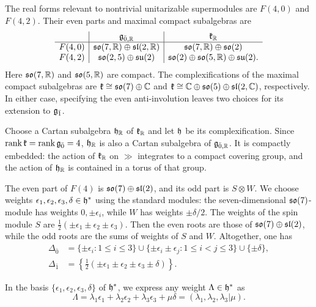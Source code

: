 The real forms relevant to nontrivial unitarizable supermodules
are $F(4,0)$ and $F(4,2)$. Their even parts and maximal compact
subalgebras are
\begin{equation}
\begin{array}{c|c|c}
&{\mathfrak{g}}_{\bar0,{\mathbb R}}&{\mathfrak k}_{{\mathbb R}}\\ \hline
F(4,0)
&{\mathfrak{so}}(7,{\mathbb R})\oplus{\mathfrak{sl}}(2,{\mathbb R})
&{\mathfrak{so}}(7,{\mathbb R})\oplus{\mathfrak{so}}(2)\\
F(4,2)
&{\mathfrak{so}}(2,5)\oplus{\mathfrak{su}}(2)
&{\mathfrak{so}}(2)\oplus{\mathfrak{so}}(5,{\mathbb R})\oplus{\mathfrak{su}}(2).
\end{array}
\end{equation}
Here ${\mathfrak{so}}(7,{\mathbb R})$ and ${\mathfrak{so}}(5,{\mathbb R})$ are compact. The
complexifications of the maximal compact subalgebras are
${\mathfrak k}\cong{\mathfrak{so}}(7)\oplus{\mathbb C}$ and
${\mathfrak k}\cong{\mathbb C}\oplus{\mathfrak{so}}(5)\oplus{\mathfrak{sl}}(2,{\mathbb C})$, respectively.
In either case, specifying the even anti-involution leaves
two choices for its extension to ${\mathfrak{g}_{\bar{1}}}$.

Choose a Cartan subalgebra ${\mathfrak h}_{{\mathbb R}}$ of ${\mathfrak k}_{{\mathbb R}}$ and
let ${\mathfrak h}$ be its complexification. Since
$\operatorname{rank}{\mathfrak k}=\operatorname{rank}{\mathfrak{g}_{\bar{0}}}=4$,
${\mathfrak h}_{{\mathbb R}}$ is also a Cartan subalgebra of ${\mathfrak{g}}_{\bar0,{\mathbb R}}$.
It is compactly embedded: the action of ${\mathfrak k}_{{\mathbb R}}$ on $\gg$
integrates to a compact covering group, and the action of
${\mathfrak h}_{{\mathbb R}}$ is contained in a torus of that group.


The even part of $F(4)$ is ${\mathfrak{so}}(7)\oplus{\mathfrak{sl}}(2)$, and its odd part is $S\otimes W$. We choose weights $\epsilon_1,\epsilon_2,\epsilon_3,\delta\in{\mathfrak h}^*$ using the standard modules: the seven-dimensional ${\mathfrak{so}}(7)$-module has weights $0,\pm\epsilon_i$, while $W$ has weights $\pm\delta/2$. The weights of the spin module $S$ are $\frac12(\pm\epsilon_1\pm\epsilon_2\pm\epsilon_3)$. Then the even roots are those of ${\mathfrak{so}}(7)\oplus{\mathfrak{sl}}(2)$, while the odd roots are the sums of weights of $S$ and $W$. Altogether, one has
\begin{equation}\label{eq::F4_roots}
\begin{aligned}
\Delta_{\bar0}
&=
\{\pm\epsilon_i:1\leq i\leq3\}
\cup
\{\pm\epsilon_i\pm\epsilon_j:1\leq i<j\leq3\}
\cup\{\pm\delta\},\\
\Delta_{\bar1}
&=
\left\{
\frac12(\pm\epsilon_1\pm\epsilon_2\pm\epsilon_3\pm\delta)
\right\}.
\end{aligned}
\end{equation}

In the basis $\{\epsilon_{1},\epsilon_{2},\epsilon_{3},\delta\}$ of ${\mathfrak h}^{\ast}$, we express any weight $\Lambda \in {\mathfrak h}^{\ast}$ as
\begin{equation}\Lambda=\lambda_1\epsilon_1+\lambda_2\epsilon_2+
\lambda_3\epsilon_3+\mu\delta
=(\lambda_1,\lambda_2,\lambda_3\vert\mu).\end{equation}


